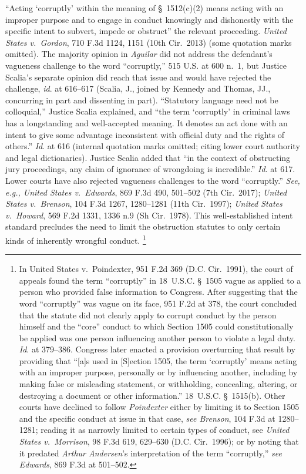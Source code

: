 ``Acting `corruptly' within the meaning of \S~1512(c)(2) means acting with an improper purpose and to engage in conduct knowingly and dishonestly with the specific intent to subvert, impede or obstruct'' the relevant proceeding.
\textit{United States v.\ Gordon}, 710 F.3d 1124, 1151 (10th Cir.~2013) (some quotation marks omitted).
The majority opinion in \textit{Aguilar} did not address the defendant's vagueness challenge to the word ``corruptly,'' 515 U.S. at 600 n.~1, but Justice Scalia's separate opinion did reach that issue and would have rejected the challenge, \textit{id}. at 616--617 (Scalia, J., joined by Kennedy and Thomas, JJ., concurring in part and dissenting in part).
``Statutory language need not be colloquial,'' Justice Scalia explained, and ``the term `corruptly' in criminal laws has a longstanding and well-accepted meaning.
It denotes an act done with an intent to give some advantage inconsistent with official duty and the rights of others.''
\textit{Id}. at 616 (internal quotation marks omitted; citing lower court authority and legal dictionaries).
Justice Scalia added that ``in the context of obstructing jury proceedings, any claim of ignorance of wrongdoing is incredible.''
\textit{Id}. at 617.
Lower courts have also rejected vagueness challenges to the word ``corruptly.''
\textit{See, e.g., United States v.\ Edwards}, 869 F.3d 490, 501--502 (7th Cir.~2017);
\textit{United States v.\ Brenson}, 104 F.3d 1267, 1280--1281 (11th Cir.~1997);
\textit{United States v.\ Howard}, 569 F.2d 1331, 1336 n.9 (Sh Cir.~1978).
This well-established intent standard precludes the need to limit the obstruction statutes to only certain kinds of inherently wrongful conduct.%
\footnote{In United States v.\ Poindexter, 951 F.2d 369 (D.C. Cir.~1991), the court of appeals found the term ``corruptly'' in 18~U.S.C. \S~1505 vague as applied to a person who provided false information to Congress.
After suggesting that the word ``corruptly'' was vague on its face, 951 F.2d at 378, the court concluded that the statute did not clearly apply to corrupt conduct by the person himself and the ``core'' conduct to which Section 1505 could constitutionally be applied was one person influencing another person to violate a legal duty.
\textit{Id}. at 379--386.
Congress later enacted a provision overturning that result by providing that ``[a]s used in [S]ection 1505, the term `corruptly' means acting with an improper purpose, personally or by influencing another, including by making false or misleading statement, or withholding, concealing, altering, or destroying a document or other information.''
18~U.S.C. \S~1515(b).
Other courts have declined to follow \textit{Poindexter} either by limiting it to Section 1505 and the specific conduct at issue in that case, \textit{see Brenson}, 104 F.3d at 1280--1281;
reading it as narrowly limited to certain types of conduct, see \textit{United States v.\ Morrison}, 98 F.3d 619, 629--630 (D.C. Cir.~1996);
or by noting that it predated \textit{Arthur Andersen}'s interpretation of the term ``corruptly,'' \textit{see Edwards}, 869 F.3d at 501--502.
 }


